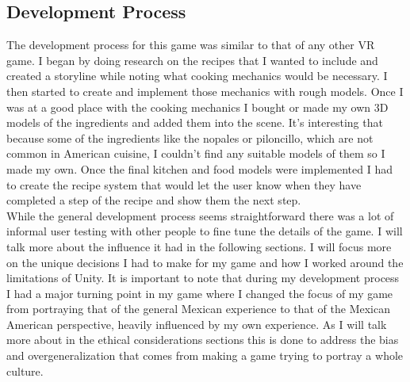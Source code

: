 \documentclass[10pt,twocolumn]{article}
\begin{document}
\subsection{Development Process}
The development process for this game was similar to that of any other VR game. I began by doing research on the recipes that I wanted to include and created a storyline while noting what cooking mechanics would be necessary. I then started to create and implement those mechanics with rough models. Once I was at a good place with the cooking mechanics I bought or made my own 3D models of the ingredients and added them into the scene. It’s interesting that because some of the ingredients like the nopales or piloncillo, which are not common in American cuisine, I couldn’t find any suitable models of them so I made my own. Once the final kitchen and food models were implemented I had to create the recipe system that would let the user know when they have completed a step of the recipe and show them the next step.
\\
While the general development process seems straightforward there was a lot of informal user testing with other people to fine tune the details of the game. I will talk more about the influence it had in the following sections. I will focus more on the unique decisions I had to make for my game and how I worked around the limitations of Unity. It is important to note that during my development process I had a major turning point in my game where I changed the focus of my game from portraying that of the general Mexican experience to that of the Mexican American perspective, heavily influenced by my own experience. As I will talk more about in the ethical considerations sections this is done to address the bias and overgeneralization that comes from making a game trying to portray a whole culture. 
\end{document}
